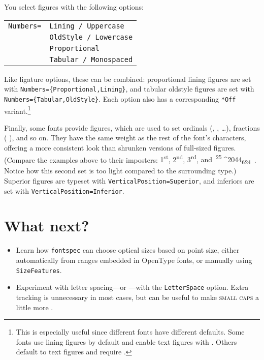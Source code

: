 You select figures with the following options:
\begin{leftfigure}
\begin{tabular}{l l}
\texttt{Numbers=} & \texttt{Lining / Uppercase} \\
 & \texttt{OldStyle / Lowercase} \\
 & \texttt{Proportional} \\
 & \texttt{Tabular / Monospaced}
\end{tabular}
\end{leftfigure}
Like ligature options, these can be combined:
proportional lining figures are set
with \texttt{Numbers=\allowbreak\{Proportional,\allowbreak Lining\}},
and tabular oldstyle figures are set with
\texttt{Numbers=\allowbreak\{Tabular,\allowbreak OldStyle\}}.
Each option also has a corresponding \verb|*Off|
variant.\punckern\footnote{This is especially useful since different fonts
have different defaults.
Some fonts use lining figures by default and enable text figures
with .
Others default to text figures and require .}

Finally, some fonts provide  figures,
which are used to set ordinals
(,  , \dots),
fractions (\,\,), and so on.
They have the same weight as the rest of the font's characters,
offering a more consistent look than shrunken versions of full-sized figures.
(Compare the examples above to their imposters:
{%
\mbox{1\textsuperscript{st}},
\mbox{2\textsuperscript{nd}},
\mbox{3\textsuperscript{rd}},
and
\,\mbox{\textsuperscript{25}^^^^2044\textsubscript{624}}%
\,}.
Notice how this second set is too light compared to the surrounding
type.)
Superior figures are typeset with
\texttt{VerticalPosition=\allowbreak Superior},
and inferiors are set with \texttt{VerticalPosition=\allowbreak Inferior}.

\section{What next?}
\begin{itemize}
\item Learn how \texttt{fontspec} can choose optical sizes based on
    point size, either automatically from ranges embedded in OpenType fonts,
    or manually using \texttt{SizeFeatures}.
\item Experiment with letter spacing---or ---with
    the \texttt{LetterSpace} option.
    Extra tracking is unnecessary in most cases,
    but can be useful to make \textsc{small caps}
    a little more .
\end{itemize}
